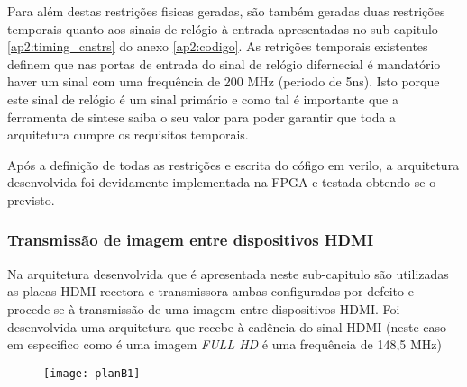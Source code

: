 Para além destas restrições fisicas geradas, são também geradas duas restrições temporais quanto aos sinais de relógio à entrada apresentadas no sub-capitulo \ref{ap2:timing_cnstrs} do anexo \ref{ap2:codigo}. As retrições temporais existentes definem que nas portas de entrada do sinal de relógio difernecial é mandatório haver um sinal com uma frequência de 200 MHz (periodo de 5ns). Isto porque este sinal de relógio é um sinal primário e como tal é importante que a ferramenta de sintese saiba o seu valor para poder garantir que toda a arquitetura cumpre os requisitos temporais.

Após a definição de todas as restrições e escrita do cófigo em verilo, a arquitetura desenvolvida foi devidamente implementada na FPGA e testada obtendo-se o previsto.
\subsubsection{Transmissão de imagem entre dispositivos HDMI}

Na arquitetura desenvolvida que é apresentada neste sub-capitulo são utilizadas as placas HDMI recetora e transmissora ambas configuradas por defeito e procede-se à transmissão de uma imagem entre dispositivos HDMI. Foi desenvolvida uma arquitetura que recebe à cadência do sinal HDMI (neste caso em especifico como é uma imagem \textit{FULL HD} é uma frequência de 148,5 MHz)

\begin{figure}[h!]
	\begin{center}
		\leavevmode
		\texttt{[image: planB1]}
		\caption{}
		\label{fig:planb1}
	\end{center}
\end{figure}


